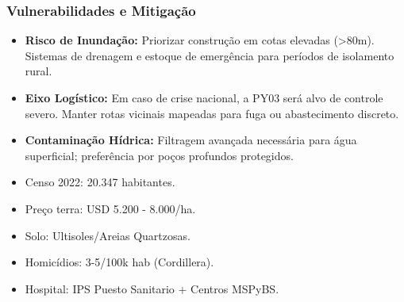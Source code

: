 \subsubsection{Vulnerabilidades e
Mitigação}

\begin{itemize}
\item
  \textbf{Risco de Inundação:} Priorizar construção em cotas elevadas
  (\textgreater80m). Sistemas de drenagem e estoque de emergência para
  períodos de isolamento rural.
\item
  \textbf{Eixo Logístico:} Em caso de crise nacional, a PY03 será alvo
  de controle severo. Manter rotas vicinais mapeadas para fuga ou
  abastecimento discreto.
\item
  \textbf{Contaminação Hídrica:} Filtragem avançada necessária para água
  superficial; preferência por poços profundos protegidos.
\item
  Censo 2022: 20.347 habitantes.
\item
  Preço terra: USD 5.200 - 8.000/\allowbreak ha.
\item
  Solo: Ultisoles/\allowbreak Areias Quartzosas.
\item
  Homicídios: 3-5/\allowbreak 100k hab (Cordillera).
\item
  Hospital: IPS Puesto Sanitario + Centros MSPyBS.
\end{itemize}

